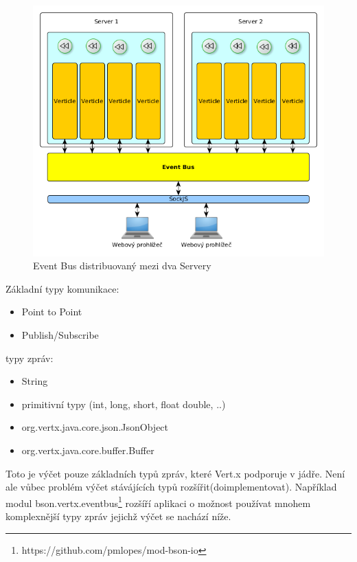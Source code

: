 \begin{figure}
\begin{centering}
\includegraphics[scale=0.5]{obrazky/2instance4_eventbus}
\par\end{centering}
\caption{Event Bus distribuovaný mezi dva Servery}
\label{fig:2instance4_eventbus}
\end{figure}

Základní typy komunikace:
\begin{itemize}
\item{Point to Point}
\item{Publish/Subscribe}
\end{itemize}

typy zpráv:
\begin{itemize}
\item{String}
\item{primitivní typy (int, long, short, float double, ..)}
\item{org.vertx.java.core.json.JsonObject}
\item{org.vertx.java.core.buffer.Buffer}
\end{itemize}

Toto je výčet pouze základních typů zpráv, které Vert.x podporuje v jádře. Není ale vůbec problém výčet stávájících typů rozšířit(doimplementovat). Například modul bson.vertx.eventbus\footnote{https://github.com/pmlopes/mod-bson-io} rozšíří aplikaci o možnost používat mnohem komplexnější typy zpráv jejichž výčet se nachází níže.


